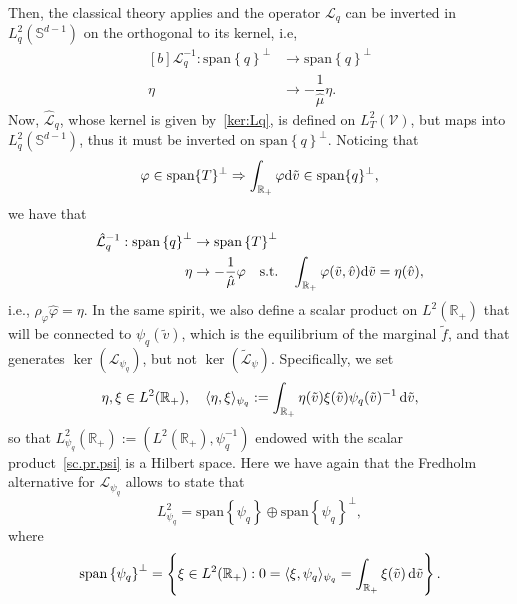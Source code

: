 \documentclass[a4paper]{article}
\theoremstyle{Theorem}\newtheorem{proposition}{Proposition}[section]
\theoremstyle{Remark}\newtheorem{remark}{Remark}[section]
\theoremstyle{Theorem}\newtheorem{theorem}{Theorem}[section]
\DeclarePairedDelimiter\ave{\langle}{\rangle}
\newcommand{\R}{\mathbb{R}}
\newcommand{\hv}{\hat{v}}
\newcommand{\tv}{\tilde{v}}
\newcommand{\tf}{\tilde{f}}
\newcommand{\hphi}{\hat{\varphi}}
\newcommand{\hmu}{\hat{\mu}}
\newcommand{\intR}{\int_{\R_+}}
\begin{document}
Then, the classical theory applies and the operator $\mathcal{L}_q$ can be inverted in $L^2_q(\mathbb{S}^{d-1})$ on the orthogonal to its kernel, i.e,
\begin{equation*}
\begin{aligned}[b]
    \mathcal{L}_q^{-1}:  \text{span}\left\lbrace q\right\rbrace^{\bot} &\to \text{span}\left\lbrace q\right\rbrace^{\bot}\\
    \eta &\to -\dfrac{1}{\hmu}\eta.
    \end{aligned}
\end{equation*}
Now, $\hat{\mathcal{L}}_q$, whose kernel is given by~\eqref{ker:Lq}, is defined on $L^2_T(\mathcal{V})$, but maps into $L^2_q(\mathbb{S}^{d-1})$, thus it must be inverted on $ \text{span}\left\lbrace q\right\rbrace^{\bot}$. Noticing that
\begin{equation*}\label{qbot}
    \varphi \in \text{span}\lbrace T \rbrace^{\bot} \Rightarrow \intR \varphi {\rm d}\tv \in \text{span}\lbrace q \rbrace^{\bot},
\end{equation*}
we have that
\begin{equation}\label{Lq.inv}
\begin{aligned}[b]
    \hat{\mathcal{L}}_q^{-1}:  \text{span}\left\lbrace q\right\rbrace^{\bot} &\to \text{span}\left\lbrace T\right\rbrace^{\bot}\\
    \eta &\to -\dfrac{1}{\hmu}\varphi \quad \text{s.t.} \quad \intR \varphi(\tv,\hv) {\rm d} \tv = \eta(\hv),
    \end{aligned}
\end{equation}
i.e., $\rho_\varphi \hphi=\eta.$
In the same spirit, we also define a scalar product on $L^2(\R_+)$ that will be connected to $\psi_q(\tv)$, which is the equilibrium of the marginal $\tf$, and that generates $\ker(\mathcal{L}_{\psi_q})$, but not $\ker(\tilde{\mathcal{L}}_{\psi})$. Specifically, we set
\begin{equation}\label{sc.pr.psi}
    \eta, \xi \in L^2(\R_+), \quad \ave{\eta,\xi}_{\psi_q}:=\intR \eta(\tv) \xi(\tv) \psi_q(\tv)^{-1}  \, {\rm d} \tv,
\end{equation}
so that $L^2_{\psi_q}(\R_+):=(L^2(\R_+),\psi_q^{-1})$ endowed with the scalar product~\eqref{sc.pr.psi} is a Hilbert space. Here we have again that the Fredholm alternative for $\mathcal{L}_{\psi_q}$ allows to state that 
\[
L^2_{\psi_q} = \text{span}\left\lbrace \psi_q\right\rbrace \oplus \text{span}\left\lbrace \psi_q\right\rbrace^{\bot}, 
\]
where
\begin{equation*}
 \text{span}\left\lbrace \psi_q\right\rbrace^{\bot}=\left\lbrace \xi \in L^2(\R_+): 0=\ave{\xi,\psi_q}_{\psi_q}=\intR \xi(\tv) \, {\rm d} \tv \right\rbrace.  
\end{equation*}
\end{document}
